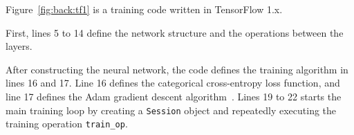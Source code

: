 % 

\begin{inred}
Figure~\ref{fig:back:tf1} is a training code written in TensorFlow 1.x.
\end{inred}
First, lines 5 to 14 define the network structure and the operations
between the layers.
\begin{inred}
After constructing the neural network, the code defines the training algorithm
in lines 16 and 17.
Line 16 defines the categorical cross-entropy loss function,
and line 17 defines the Adam gradient descent algorithm~\cite{kingma2014adam}.
Lines 19 to 22 starts the main training loop
by creating a {\tt Session} object and repeatedly executing 
the training operation {\tt train\_op}.



\end{inred}


